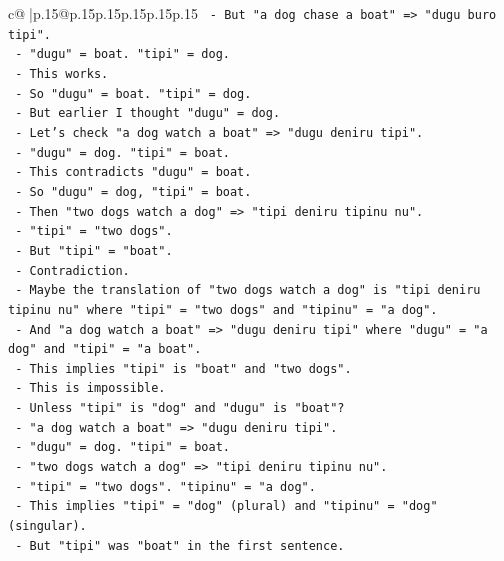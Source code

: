 \documentclass{article}
\begin{document}
{\begin{supertabular}{c@{$\;$}|p{.15\linewidth}@{}p{.15\linewidth}p{.15\linewidth}p{.15\linewidth}p{.15\linewidth}p{.15\linewidth}}
{{{\texttt{             {-} But "a dog chase a boat" => "dugu buro tipi".} \\
\texttt{               {-} "dugu" = boat. "tipi" = dog.} \\
\texttt{               {-} This works.} \\
\texttt{             {-} So "dugu" = boat. "tipi" = dog.} \\
\texttt{             {-} But earlier I thought "dugu" = dog.} \\
\texttt{             {-} Let's check "a dog watch a boat" => "dugu deniru tipi".} \\
\texttt{               {-} "dugu" = dog. "tipi" = boat.} \\
\texttt{               {-} This contradicts "dugu" = boat.} \\
\texttt{             {-} So "dugu" = dog, "tipi" = boat.} \\
\texttt{             {-} Then "two dogs watch a dog" => "tipi deniru tipinu nu".} \\
\texttt{               {-} "tipi" = "two dogs".} \\
\texttt{               {-} But "tipi" = "boat".} \\
\texttt{               {-} Contradiction.} \\
\texttt{       {-} Maybe the translation of "two dogs watch a dog" is "tipi deniru tipinu nu" where "tipi" = "two dogs" and "tipinu" = "a dog".} \\
\texttt{       {-} And "a dog watch a boat" => "dugu deniru tipi" where "dugu" = "a dog" and "tipi" = "a boat".} \\
\texttt{       {-} This implies "tipi" is "boat" and "two dogs".} \\
\texttt{       {-} This is impossible.} \\
\texttt{       {-} Unless "tipi" is "dog" and "dugu" is "boat"?} \\
\texttt{         {-} "a dog watch a boat" => "dugu deniru tipi".} \\
\texttt{           {-} "dugu" = dog. "tipi" = boat.} \\
\texttt{         {-} "two dogs watch a dog" => "tipi deniru tipinu nu".} \\
\texttt{           {-} "tipi" = "two dogs". "tipinu" = "a dog".} \\
\texttt{           {-} This implies "tipi" = "dog" (plural) and "tipinu" = "dog" (singular).} \\
\texttt{           {-} But "tipi" was "boat" in the first sentence.} \\
}}}
\end{supertabular}}
\end{document}
